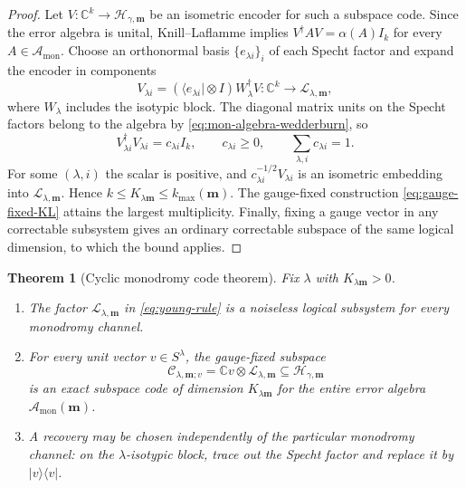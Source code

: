 \documentclass[11pt]{article}
\newtheorem{theorem}{Theorem}[section]
\theoremstyle{definition}
\theoremstyle{remark}
\newcommand{\C}{\mathbb C}
\newcommand{\cH}{\mathcal H}
\newcommand{\cA}{\mathcal A}
\newcommand{\cC}{\mathcal C}
\newcommand{\cL}{\mathcal L}
\newcommand{\bra}[1]{\langle #1\rvert}
\newcommand{\proj}[1]{\lvert #1\rangle\!\langle #1\rvert}
\begin{document}
\begin{proof}
Let $V:\C^k\to\cH_{\gamma,\boldsymbol m}$ be an isometric encoder for such a subspace code.  Since the error algebra is unital, Knill--Laflamme implies $V^\dagger A V=\alpha(A)I_k$ for every $A\in\cA_{\mathrm{mon}}$.  Choose an orthonormal basis $\{e_{\lambda i}\}_i$ of each Specht factor and expand the encoder in components
\[
 V_{\lambda i}=(\bra{e_{\lambda i}}\otimes I)W_\lambda^\dagger V:
 \C^k\longrightarrow\cL_{\lambda,\boldsymbol m},
\]
where $W_\lambda$ includes the isotypic block.  The diagonal matrix units on the Specht factors belong to the algebra by \eqref{eq:mon-algebra-wedderburn}, so
\[
 V_{\lambda i}^\dagger V_{\lambda i}=c_{\lambda i}I_k,
 \qquad c_{\lambda i}\geq0,
 \qquad\sum_{\lambda,i}c_{\lambda i}=1.
\]
For some $(\lambda,i)$ the scalar is positive, and $c_{\lambda i}^{-1/2}V_{\lambda i}$ is an isometric embedding into $\cL_{\lambda,\boldsymbol m}$.  Hence $k\leq K_{\lambda\boldsymbol m}\leq k_{\max}(\boldsymbol m)$.  The gauge-fixed construction \eqref{eq:gauge-fixed-KL} attains the largest multiplicity.  Finally, fixing a gauge vector in any correctable subsystem gives an ordinary correctable subspace of the same logical dimension, to which the bound applies.
\end{proof}

\begin{theorem}[Cyclic monodromy code theorem]\label{thm:cyclic-code}
Fix $\lambda$ with $K_{\lambda\boldsymbol m}>0$.
\begin{enumerate}
\item The factor $\cL_{\lambda,\boldsymbol m}$ in \eqref{eq:young-rule} is a noiseless logical subsystem for every monodromy channel.
\item For every unit vector $v\in S^\lambda$, the gauge-fixed subspace
\begin{equation}\label{eq:cyclic-code-subspace}
 \cC_{\lambda,\boldsymbol m;v}
 =\C v\otimes\cL_{\lambda,\boldsymbol m}
 \subseteq\cH_{\gamma,\boldsymbol m}
\end{equation}
is an exact subspace code of dimension $K_{\lambda\boldsymbol m}$ for the entire error algebra $\cA_{\mathrm{mon}}(\boldsymbol m)$.
\item A recovery may be chosen independently of the particular monodromy channel: on the $\lambda$-isotypic block, trace out the Specht factor and replace it by $\proj{v}$.
\end{enumerate}
\end{theorem}
\end{document}
